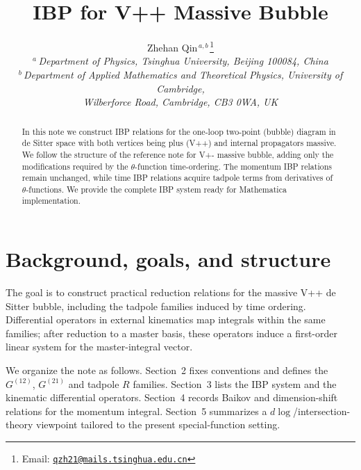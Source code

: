 \documentclass[a4paper,12pt]{article}
\newcommand{\fnemail}[1]{\footnote{Email: \href{mailto:#1}{\nolinkurl{#1}}}}
\begin{document}
\title{\Large\textbf{IBP for V++ Massive Bubble\\[2mm]}}

\author{Zhehan Qin$^{\,a,b\,}$\fnemail{qzh21@mails.tsinghua.edu.cn}\\[5mm]
	$^a\,$\normalsize{\emph{Department of Physics, Tsinghua University, Beijing 100084, China} }\\
	$^b\,$\normalsize{\emph{Department of Applied Mathematics and Theoretical Physics, University of Cambridge,}}\\\normalsize{\emph{Wilberforce Road, Cambridge, CB3 0WA, UK}}\\
}

\date{}
\maketitle

\vspace{20mm}

\begin{abstract}
In this note we construct IBP relations for the one-loop two-point (bubble) diagram in de Sitter space with both vertices being plus (V++) and internal propagators massive. We follow the structure of the reference note for V+- massive bubble, adding only the modifications required by the $\theta$-function time-ordering. The momentum IBP relations remain unchanged, while time IBP relations acquire tadpole terms from derivatives of $\theta$-functions. We provide the complete IBP system ready for Mathematica implementation.
	\vspace{10mm}
\end{abstract}

\newpage
\tableofcontents


\section{Background, goals, and structure}
The goal is to construct practical reduction relations for the massive V++ de Sitter bubble, including the tadpole families induced by time ordering. Differential operators in external kinematics map integrals within the same families; after reduction to a master basis, these operators induce a first-order linear system for the master-integral vector.

We organize the note as follows. Section~2 fixes conventions and defines the $G^{(12)}$, $G^{(21)}$ and tadpole $R$ families. Section~3 lists the IBP system and the kinematic differential operators. Section~4 records Baikov and dimension-shift relations for the momentum integral. Section~5 summarizes a $d\log$/intersection-theory viewpoint tailored to the present special-function setting.
\end{document}
